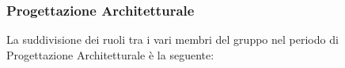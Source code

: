 		\subsubsection{Progettazione Architetturale}
			La suddivisione dei ruoli tra i vari membri del gruppo nel periodo di Progettazione Architetturale è la seguente:
			
%		
%			
